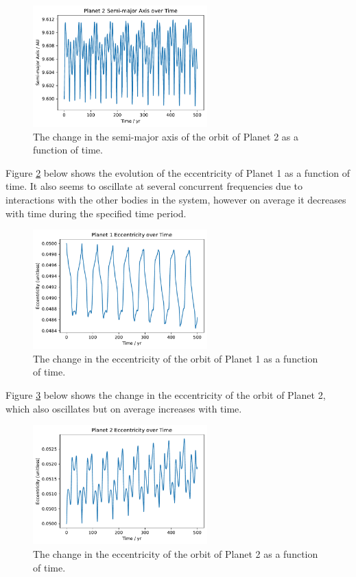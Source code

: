 \documentclass{article}
\begin{document}
\begin{figure}[htp]
    \centering
    \includegraphics[width=0.6\textwidth]{q1f3.pdf}
    \captionsetup{justification=centering}
    \caption{The change in the semi-major axis of the orbit of Planet 2 as a function of time.}
    \label{fig:q1f3}
\end{figure}

\newpage

Figure \ref{fig:q1f4} below shows the evolution of the eccentricity of Planet 1 as a function of time. It also seems to oscillate at several concurrent frequencies due to interactions with the other bodies in the system, however on average it decreases with time during the specified time period.

\begin{figure}[htp]
    \centering
    \includegraphics[width=0.6\textwidth]{q1f4.pdf}
    \captionsetup{justification=centering}
    \caption{The change in the eccentricity of the orbit of Planet 1 as a function of time.}
    \label{fig:q1f4}
\end{figure}

Figure \ref{fig:q1f5} below shows the change in the eccentricity of the orbit of Planet 2, which also oscillates but on average increases with time.

\begin{figure}[htp]
    \centering
    \includegraphics[width=0.6\textwidth]{q1f5.pdf}
    \captionsetup{justification=centering}
    \caption{The change in the eccentricity of the orbit of Planet 2 as a function of time.}
    \label{fig:q1f5}
\end{figure}
\end{document}
